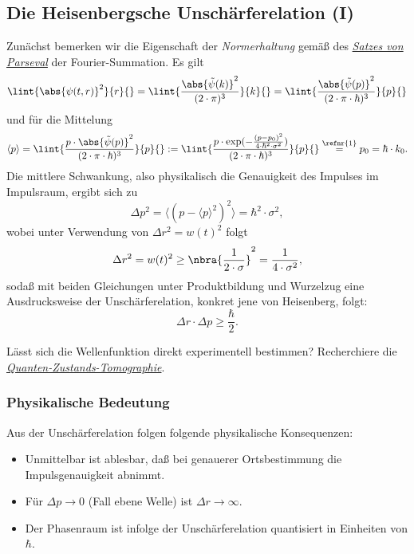 \documentclass{subfiles}
\begin{document}
    \subsection{Die Heisenbergsche Unschärferelation (I)}
        Zunächst bemerken wir die Eigenschaft der \emph{Normerhaltung} gemäß des \href{https://de.wikipedia.org/wiki/Satz_von_Parseval}{\emph{Satzes von Parseval}} der Fourier-Summation. Es gilt 
        \[\lint{\abs{\psi(t,r)}^2}{r}{} = \lint{\frac{\abs{\tilde\psi(k)}^2}{(2\cdot\pi)^3}}{k}{} = \lint{\frac{\abs{\tilde\psi(p)}^2}{(2\cdot\pi\cdot\hbar)^3}}{p}{}\]
        und für die Mittelung
        \[\langle p\rangle = \lint{\frac{p\cdot\abs{\tilde\psi(p)}^2}{(2\cdot\pi\cdot\hbar)^3}}{p}{} := \lint{\frac{p\cdot\exp(-\frac{(p-p_0)^2}{4\cdot\hbar^2\cdot\sigma^2})}{(2\cdot\pi\cdot\hbar)^3}}{p}{} \stackrel{\refnr{1}}{=} p_0 = \hbar\cdot k_0.\]
        Die mittlere Schwankung, also physikalisch die Genauigkeit des Impulses im Impulsraum, ergibt sich zu
        \[\Delta p^2 = \langle (p-\langle p\rangle^2)^2\rangle = \hbar^2\cdot\sigma^2,\]
        wobei unter Verwendung von $\Delta r^2 = w(t)^2$ folgt
        \[\Delta r^2 = w(t)^2\geq \nbra{\frac{1}{2\cdot\sigma}}^2 = \frac{1}{4\cdot\sigma^2},\]
        sodaß mit beiden Gleichungen unter Produktbildung und Wurzelzug eine Ausdrucksweise der Unschärferelation, konkret jene von Heisenberg, folgt:
        \[\Delta r \cdot\Delta p \geq \frac{\hbar}{2}.\]
        \begin{Aufgabe}
            \nr{} Lässt sich die Wellenfunktion direkt experimentell bestimmen? Recherchiere die \href{https://de.wikipedia.org/wiki/Quantentomographie}{\emph{Quanten-Zustands-Tomographie}}.
        \end{Aufgabe}

        \subsubsection*{Physikalische Bedeutung}
            Aus der Unschärferelation folgen folgende physikalische Konsequenzen:
            \begin{itemize}[label=$\to$]
                \item Unmittelbar ist ablesbar, daß bei genauerer Ortsbestimmung die Impulsgenauigkeit abnimmt. 
                \item Für $\Delta p\to 0$ (Fall ebene Welle) ist $\Delta r \to \infty$. 
                \item Der Phasenraum ist infolge der Unschärferelation quantisiert in Einheiten von $\hbar$.
            \end{itemize}
\end{document}
